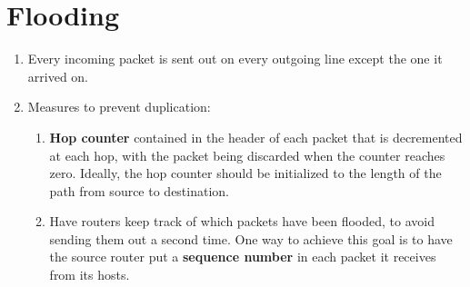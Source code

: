 \documentclass[a4paper,oneside]{book}
\begin{document}
\section{Flooding}
\begin{enumerate}
\item Every incoming packet is sent out on every outgoing line except the one it arrived on.
\item Measures to prevent duplication:
\begin{enumerate}
\item  \textbf{Hop counter} contained in the header of each packet that is decremented at each hop, with the packet being discarded when the counter reaches zero. Ideally, the hop counter should be initialized to the length of the path from source to destination.
\item  Have routers keep track of which packets have been flooded, to avoid sending them out a second time. One
way to achieve this goal is to have the source router put a \textbf{sequence number} in each packet it receives from its hosts. 
\end{enumerate}
\end{enumerate}
\end{document}
